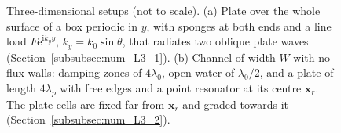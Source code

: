 \begin{figure}[t]
    \caption{Three-dimensional setups (not to scale). (a) Plate over the whole surface of a box periodic in $y$, with sponges at both ends and a line load $F\mathrm{e}^{\mathrm{i}k_yy}$, $k_y=k_0\sin\theta$, that radiates two oblique plate waves (Section~\ref{subsubsec:num_L3_1}). (b) Channel of width $W$ with no-flux walls: damping zones of $4\lambda_0$, open water of $\lambda_0/2$, and a plate of length $4\lambda_p$ with free edges and a point resonator at its centre $\boldsymbol{x}_r$. The plate cells are fixed far from $\boldsymbol{x}_r$ and graded towards it (Section~\ref{subsubsec:num_L3_2}).}
    \label{fig:num_sketch_3D}
\end{figure}

